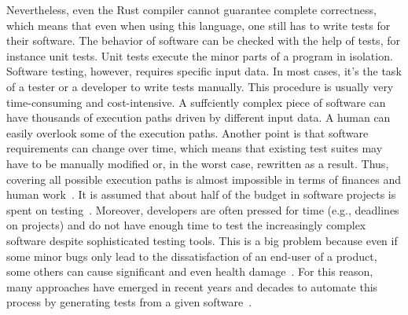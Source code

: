 \documentclass{article}
\begin{document}
Nevertheless, even the Rust compiler cannot guarantee complete correctness, which means that even when using this language, one still has to write tests for their software. The behavior of software can be checked with the help of tests, for instance unit tests. Unit tests execute the minor parts of a program in isolation. Software testing, however, requires specific input data. In most cases, it's the task of a tester or a developer to write tests manually. This procedure is usually very time-consuming and cost-intensive. A suffciently complex piece of software can have thousands of execution paths driven by different input data. A human can easily overlook some of the execution paths. Another point is that software requirements can change over time, which means that existing test suites may have to be manually modified or, in the worst case, rewritten as a result. Thus, covering all possible execution paths is almost impossible in terms of finances and human work~\cite{Myers2012}. It is assumed that about half of the budget in software projects is spent on testing~\cite{Beizer2003}. Moreover, developers are often pressed for time (e.g., deadlines on projects) and do not have enough time to test the increasingly complex software despite sophisticated testing tools. This is a big problem because even if some minor bugs only lead to the dissatisfaction of an end-user of a product, some others can cause significant and even health damage~\cite{Myers2012}. For this reason, many approaches have emerged in recent years and decades to automate this process by generating tests from a given software~\cite{McMinn_2004}.
\end{document}
